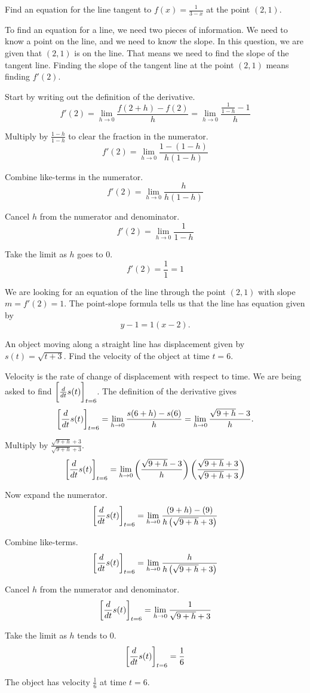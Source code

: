 \documentclass{ximera}
\begin{document}
\begin{example}
	Find an equation for the line tangent to $f(x) = \frac{1}{3-x}$ at the point $(2, 1)$.
	\begin{explanation}
		To find an equation for a line, we need two pieces of information.  We need to know
		a point on the line, and we need to know the slope.  In this question, we are given
		that $(2,1)$ is on the line.  That means we need to find the slope of the tangent line.
		Finding the slope of the tangent line at the point $(2,1)$ means finding $f'(2)$.
		
		Start by writing out the definition of the derivative.
		\[ f'(2) = \lim_{h\to 0} \frac{f(2+h)-f(2)}{h} = \lim_{h\to 0} \frac{\frac{1}{1-h} - 1}{h} \]

		Multiply by $\frac{1-h}{1-h}$ to clear the fraction in the numerator.
		\[ f'(2) = \lim_{h\to 0} \frac{1 - (1-h)}{h(1-h)} \]

		Combine like-terms in the numerator.
		\[ f'(2) = \lim_{h\to 0} \frac{h}{h(1-h)} \]

		Cancel $h$ from the numerator and denominator.
		\[ f'(2) = \lim_{h\to 0} \frac{1}{1-h} \]
		
		Take the limit as $h$ goes to $0$. 
		\[ f'(2) = \frac{1}{1} = 1 \]

		We are looking for an equation of the line through the point $(2,1)$ with slope $m = f'(2) = 1$.
		The point-slope formula tells us that the line has equation given by
		\[ y-1 = 1(x-2). \]	
	\end{explanation}
\end{example}

\begin{example}
	An object moving along a straight line has displacement given by $s(t) = \sqrt{t+3}$.  Find the velocity of the
	object at time $t=6$.
	\begin{explanation}
		Velocity is the rate of change of displacement with respect to time.  We are being asked to
		find $\bigg[ \frac{d }{d t} s(t) \bigg]_{t=6}$.
		The definition of the derivative gives
		\[ \eval{\dd{t} s(t)}_{t=6} = \lim_{h \to 0} \frac{s(6+h)-s(6)}{h} = \lim_{h\to 0} \frac{\sqrt{9+h}-3}{h}. \]
		
		Multiply by $\frac{\sqrt{9+h}+3}{\sqrt{9+h}+3}$.
		\[ \eval{\dd{t} s(t)}_{t=6} = \lim_{h\to 0} \left(\frac{\sqrt{9+h}-3}{h} \right)\left( \frac{\sqrt{9+h}+3}{\sqrt{9+h}+3} \right) \]		
		
		Now expand the numerator.		
		\[ \eval{\dd{t} s(t)}_{t=6} = \lim_{h \to 0} \frac{(9+h) - (9)}{h\left(\sqrt{9+h}+3 \right)} \]

		Combine like-terms.
		\[ \eval{\dd{t} s(t)}_{t=6} = \lim_{h \to 0} \frac{h}{h\left(\sqrt{9+h}+3\right)} \]

		Cancel $h$ from the numerator and denominator.
		\[ \eval{\dd{t} s(t)}_{t=6} = \lim_{h\to 0} \frac{1}{\sqrt{9+h}+3} \]

		Take the limit as $h$ tends to $0$.
		\[ \bigg[ \frac{d }{d t} s(t) \bigg]_{t=6} = \frac{1}{6} \]
	
		The object has velocity $\frac{1}{6}$ at time $t=6$.
	\end{explanation}
\end{example}
\end{document}
